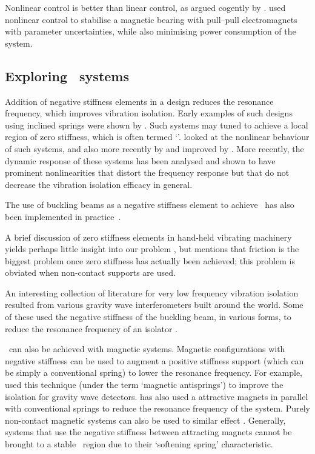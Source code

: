 Nonlinear control is better than linear control, as argued cogently by
\textcite{kokotovic1992}. \textcite{queiroz2007} used nonlinear
control to stabilise a magnetic bearing with pull--pull electromagnets
with parameter uncertainties, while also minimising power consumption
of the system.


\subsection{Exploring \qzs\ systems}

Addition of negative stiffness elements in a design reduces the resonance
frequency, which improves vibration isolation. Early examples of such designs
using inclined springs were shown by \textcite{molyneux1957}. Such systems may
tuned to achieve a local region of zero stiffness, which is often termed
`\qzs'. \textcite{alabuzhev1989} looked at the nonlinear behaviour of such
systems, and also more recently by
\textcite{carrella2006,carrella2007,carrella2008} and improved by
\textcite{kovacic2008}. More recently, the dynamic response of these systems
has been analysed \parencite{carrella2009,carrella2008thesis} and shown to
have prominent nonlinearities that distort the frequency response but that do
not decrease the vibration isolation efficacy in general.

The use of buckling beams as a negative stiffness element to achieve \qzs\ has
also been implemented in practice~\cite{platus1999,tarnai2003,lee2007}.

A brief discussion of zero stiffness elements in hand-held vibrating
machinery yields perhaps little insight into our problem
\cite{sokolov2007}, but mentions that friction is the biggest problem
once zero stiffness has actually been achieved; this problem is
obviated when non-contact supports are used.

An interesting collection of literature for very low frequency vibration
isolation resulted from various gravity wave interferometers built around the
world. Some of these used the negative stiffness of the buckling beam, in
various forms, to reduce the resonance frequency of an isolator
\cite{cella2005}.

\QZS\ can also be achieved with magnetic systems. Magnetic configurations with
negative stiffness can be used to augment a positive stiffness support (which
can be simply a conventional spring) to lower the resonance frequency. For
example, \textcite{beccaria1997} used this technique (under the term `magnetic
antisprings') to improve the isolation for gravity wave detectors.
\textcite{carrella2007a,carrella2008} has also used a attractive magnets in
parallel with conventional springs to reduce the resonance frequency of the
system. Purely non-contact magnetic systems can also be used to similar effect
\cite{robertson2006,robertson2007}. Generally, systems that use the negative
stiffness between attracting magnets cannot be brought to a stable \qzs\
region due to their `softening spring' characteristic.

